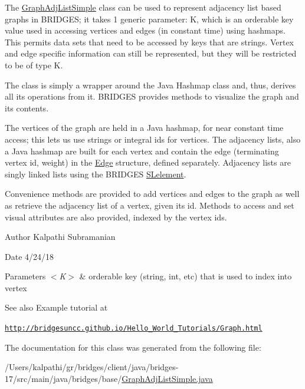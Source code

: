 The \mbox{\hyperlink{classbridges_1_1base_1_1_graph_adj_list_simple}{Graph\+Adj\+List\+Simple}} class can be used to represent adjacency list based ~\newline
graphs in B\+R\+I\+D\+G\+ES; it takes 1 generic parameter\+: K, which is an orderable key value used in accessing vertices and edges (in constant time) using hashmaps. This permits data sets that need to be accessed by keys that are strings. Vertex and edge specific information can still be represented, but they will be restricted to be of type K.

The class is simply a wrapper around the Java Hashmap class and, thus, derives all its operations from it. B\+R\+I\+D\+G\+ES provides methods to visualize the graph and its contents.

The vertices of the graph are held in a Java hashmap, for near constant time access; this lets us use strings or integral ids for vertices. The adjacency lists, also a Java hashmap are built for each vertex and contain the edge (terminating vertex id, weight) in the \mbox{\hyperlink{classbridges_1_1base_1_1_edge}{Edge}} structure, defined separately. Adjacency lists are singly linked lists using the B\+R\+I\+D\+G\+ES \mbox{\hyperlink{classbridges_1_1base_1_1_s_lelement}{S\+Lelement}}.

Convenience methods are provided to add vertices and edges to the graph as well as retrieve the adjacency list of a vertex, given its id. Methods to access and set visual attributes are also provided, indexed by the vertex ids.

\begin{DoxyAuthor}{Author}
Kalpathi Subramanian
\end{DoxyAuthor}
\begin{DoxyDate}{Date}
4/24/18
\end{DoxyDate}

\begin{DoxyParams}{Parameters}
{\em $<$\+K$>$} & orderable key (string, int, etc) that is used to index into vertex\\
\hline
\end{DoxyParams}
\begin{DoxySeeAlso}{See also}
Example tutorial at 
\end{DoxySeeAlso}
\href{http://bridgesuncc.github.io/Hello_World_Tutorials/Graph.html}{\tt http\+://bridgesuncc.\+github.\+io/\+Hello\+\_\+\+World\+\_\+\+Tutorials/\+Graph.\+html} 

The documentation for this class was generated from the following file\+:\begin{DoxyCompactItemize}
\item 
/\+Users/kalpathi/gr/bridges/client/java/bridges-\/17/src/main/java/bridges/base/\mbox{\hyperlink{_graph_adj_list_simple_8java}{Graph\+Adj\+List\+Simple.\+java}}\end{DoxyCompactItemize}
